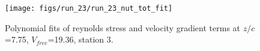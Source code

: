 \begin{figure}[H]
\centering
\texttt{[image: figs/run\_23/run\_23\_nut\_tot\_fit]}
\caption{Polynomial fits of reynolds stress and velocity gradient terms at $z/c$=7.75, $V_{free}$=19.36, station 3.}
\label{fig:run_23_nut_tot_fit}
\end{figure}


